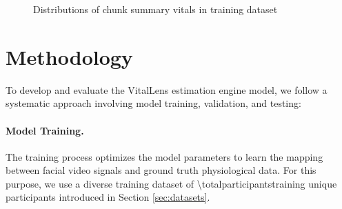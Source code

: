 \documentclass{article}
\begin{document}
\begin{figure}[h!]
    \centering
    \begin{subfigure}{0.48\textwidth}
    	\centering
    \end{subfigure}
    \hfill
    \begin{subfigure}{0.48\textwidth}
    	\centering
    \end{subfigure}
    \caption{Distributions of chunk summary vitals in training dataset}
    \label{fig:training-vitals-histogram}
\end{figure}

\section{Methodology}
\label{sec:methodology}

To develop and evaluate the VitalLens estimation engine model, we follow a systematic approach involving model training, validation, and testing:

\paragraph{Model Training.}
The training process optimizes the model parameters to learn the mapping between facial video signals and ground truth physiological data.
For this purpose, we use a diverse training dataset of \num{\totalparticipantstraining} unique participants introduced in Section \ref{sec:datasets}.
\end{document}
